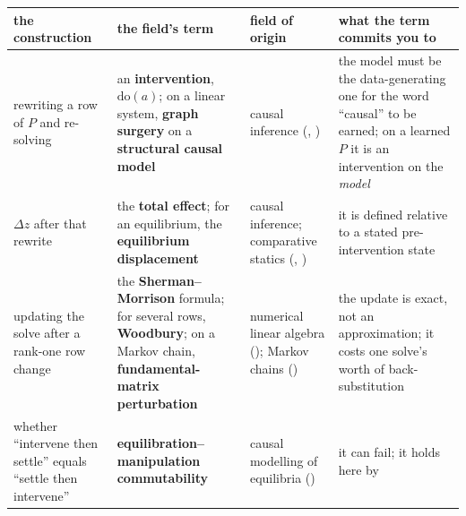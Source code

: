 \documentclass[11pt,a4paper]{article}
\newcounter{none}                 %
\theoremstyle{plain}
\theoremstyle{definition}
\theoremstyle{remark}
\begin{document}
{\def\LTcaptype{none} %
\begin{longtable}[]{@{}
  >{\raggedright\arraybackslash}p{}
  >{\raggedright\arraybackslash}p{}
  >{\raggedright\arraybackslash}p{}
  >{\raggedright\arraybackslash}p{}@{}}
\toprule\noalign{}
\begin{minipage}[b]{\linewidth}\raggedright
the construction
\end{minipage} & \begin{minipage}[b]{\linewidth}\raggedright
the field's term
\end{minipage} & \begin{minipage}[b]{\linewidth}\raggedright
field of origin
\end{minipage} & \begin{minipage}[b]{\linewidth}\raggedright
what the term commits you to
\end{minipage} \\
\midrule\noalign{}
\endhead
\bottomrule\noalign{}
\endlastfoot
rewriting a row of \(P\) and re-solving & an \textbf{intervention},
\(\mathrm{do}(a)\); on a linear system, \textbf{graph surgery} on a
\textbf{structural causal model} & causal inference
(\citep{pearl-2009-causality}, \citep{shimizu-2006-lingam}) & the model
must be the data-generating one for the word ``causal'' to be earned; on
a learned \(P\) it is an intervention on the \emph{model} \\
\(\Delta z\) after that rewrite & the \textbf{total effect}; for an
equilibrium, the \textbf{equilibrium displacement} & causal inference;
comparative statics (\citep{mooij-2013-ode2scm},
\citep{bongers-2021-cyclic}) & it is defined relative to a stated
pre-intervention state \\
updating the solve after a rank-one row change & the
\textbf{Sherman--Morrison} formula; for several rows, \textbf{Woodbury};
on a Markov chain, \textbf{fundamental-matrix perturbation} & numerical
linear algebra (\citep{sherman-1950-inverse-adjustment}); Markov chains
(\citep{schweitzer-1968-perturbation}) & the update is exact, not an
approximation; it costs one solve's worth of back-substitution \\
whether ``intervene then settle'' equals ``settle then intervene'' &
\textbf{equilibration--manipulation commutability} & causal modelling of
equilibria (\citep{dash-2005-emc}) & it can fail; it holds here by

\end{longtable}}
\end{document}

